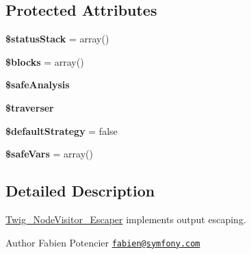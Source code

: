 \subsection*{Protected Attributes}
\begin{DoxyCompactItemize}
\item 
{\bfseries \$status\+Stack} = array()\hypertarget{classTwig__NodeVisitor__Escaper_ab44e1ebf23eb3bf56ec98e1cb7af9dd8}{}\label{classTwig__NodeVisitor__Escaper_ab44e1ebf23eb3bf56ec98e1cb7af9dd8}

\item 
{\bfseries \$blocks} = array()\hypertarget{classTwig__NodeVisitor__Escaper_a43ea0cc91564b572c461554be51c8852}{}\label{classTwig__NodeVisitor__Escaper_a43ea0cc91564b572c461554be51c8852}

\item 
{\bfseries \$safe\+Analysis}\hypertarget{classTwig__NodeVisitor__Escaper_affc87822739a70eeaabf5ef004dfa06c}{}\label{classTwig__NodeVisitor__Escaper_affc87822739a70eeaabf5ef004dfa06c}

\item 
{\bfseries \$traverser}\hypertarget{classTwig__NodeVisitor__Escaper_af94d989d71400f36c420aa52869e12a6}{}\label{classTwig__NodeVisitor__Escaper_af94d989d71400f36c420aa52869e12a6}

\item 
{\bfseries \$default\+Strategy} = false\hypertarget{classTwig__NodeVisitor__Escaper_a73ae16f4d188d75e65ee76a186af70ef}{}\label{classTwig__NodeVisitor__Escaper_a73ae16f4d188d75e65ee76a186af70ef}

\item 
{\bfseries \$safe\+Vars} = array()\hypertarget{classTwig__NodeVisitor__Escaper_aaca298353480e9860d0b4d64689e2fe1}{}\label{classTwig__NodeVisitor__Escaper_aaca298353480e9860d0b4d64689e2fe1}

\end{DoxyCompactItemize}


\subsection{Detailed Description}
\hyperlink{classTwig__NodeVisitor__Escaper}{Twig\+\_\+\+Node\+Visitor\+\_\+\+Escaper} implements output escaping.

\begin{DoxyAuthor}{Author}
Fabien Potencier \href{mailto:fabien@symfony.com}{\tt fabien@symfony.\+com} 
\end{DoxyAuthor}


